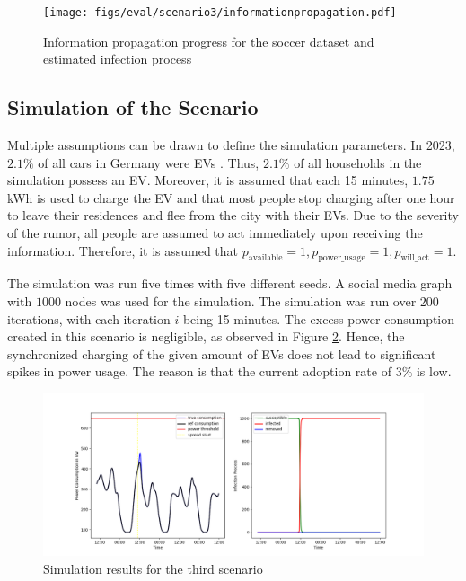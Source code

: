 \begin{figure}[!ht]
    \center
    \texttt{[image: figs/eval/scenario3/informationpropagation.pdf]}
    \caption{Information propagation progress for the soccer dataset 
    and estimated infection process}
    \label{geoloctweet}
\end{figure}

\subsection{Simulation of the Scenario}

Multiple assumptions can be drawn to define the simulation parameters. 
In 2023, $2.1\%$ of all cars in Germany were 
EVs \cite{evadoption}. Thus, $2.1\%$ of all households in the simulation
possess an EV. Moreover, it is assumed that 
each 15 minutes, $1.75$kWh is used to charge the EV 
and that most people stop charging after one hour
to leave their residences and flee from the city with their EVs.
Due to the severity of the rumor,
all people are assumed to act immediately upon 
receiving the information. Therefore, it is assumed 
that $p_{\mathrm{available}}=1, 
p_{\mathrm{power\_usage}}=1, p_{\mathrm{will\_act}}=1$.


The simulation was run five times with five different seeds. 
A social media graph with $1000$ nodes was used for the simulation. 
The simulation was run over $200$ iterations, with each
iteration $i$ being 15 minutes.
The excess power consumption created in this scenario is negligible, 
as observed in Figure \ref{thirdscenarioresults}.  Hence, the 
synchronized charging of the given amount of EVs does not
lead to significant spikes in power usage.
The reason is that the current adoption rate of $3\%$ is low.

\begin{figure}[!ht]
    \center
    \includegraphics[scale=.5]{figs/eval/scenario3/scenario3basic.png}
    \caption{Simulation results for the third scenario}
    \label{thirdscenarioresults}
\end{figure}

